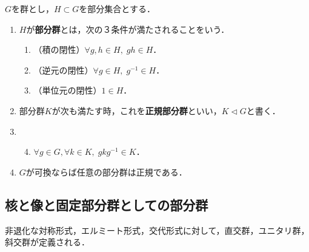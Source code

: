 \documentclass[uplatex, dvipdfmx]{jsreport}
\begin{document}
\begin{definition}
    $G$を群とし，$H\subset G$を部分集合とする．
    \begin{enumerate}
        \item $H$が\textbf{部分群}とは，次の３条件が満たされることをいう．
        \begin{enumerate}[(1)]
            \item （積の閉性）$\forall g,h\in H,\;gh\in H$．
            \item （逆元の閉性）$\forall g\in H,\;g^{-1}\in H$．
            \item （単位元の閉性）$1\in H$．
        \end{enumerate}
        \item 部分群$K$が次も満たす時，これを\textbf{正規部分群}といい，$K\triangleleft G$と書く．
        \item \begin{enumerate}[(1)]\setcounter{enumii}{3}
            \item $\forall g\in G,\forall k\in K,\;gkg^{-1}\in K$．
        \end{enumerate}
        \item $G$が可換ならば任意の部分群は正規である．
    \end{enumerate}
\end{definition}

\subsection{核と像と固定部分群としての部分群}

\begin{tcolorbox}[colframe=ForestGreen, colback=ForestGreen!10!white, breakable]
    非退化な対称形式，エルミート形式，交代形式に対して，直交群，ユニタリ群，斜交群が定義される．
\end{tcolorbox}
\end{document}
